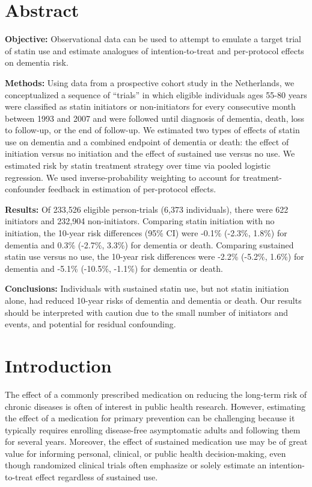 \documentclass[
]{book}
\begin{document}
\newpage
\normalsize

\hypertarget{abstract}{%
\section{Abstract}\label{abstract}}

\textbf{Objective:} Observational data can be used to attempt to emulate a target trial of statin use and estimate analogues of intention-to-treat and per-protocol effects on dementia risk.

\textbf{Methods:} Using data from a prospective cohort study in the Netherlands, we conceptualized a sequence of ``trials'' in which eligible individuals ages 55-80 years were classified as statin initiators or non-initiators for every consecutive month between 1993 and 2007 and were followed until diagnosis of dementia, death, loss to follow-up, or the end of follow-up. We estimated two types of effects of statin use on dementia and a combined endpoint of dementia or death: the effect of initiation versus no initiation and the effect of sustained use versus no use. We estimated risk by statin treatment strategy over time via pooled logistic regression. We used inverse-probability weighting to account for treatment-confounder feedback in estimation of per-protocol effects.

\textbf{Results:} Of 233,526 eligible person-trials (6,373 individuals), there were 622 initiators and 232,904 non-initiators. Comparing statin initiation with no initiation, the 10-year risk differences (95\% CI) were -0.1\% (-2.3\%, 1.8\%) for dementia and 0.3\% (-2.7\%, 3.3\%) for dementia or death. Comparing sustained statin use versus no use, the 10-year risk differences were -2.2\% (-5.2\%, 1.6\%) for dementia and -5.1\% (-10.5\%, -1.1\%) for dementia or death.

\textbf{Conclusions:} Individuals with sustained statin use, but not statin initiation alone, had reduced 10-year risks of dementia and dementia or death. Our results should be interpreted with caution due to the small number of initiators and events, and potential for residual confounding.

\newpage

\hypertarget{introduction}{%
\section{Introduction}\label{introduction}}

The effect of a commonly prescribed medication on reducing the long-term risk of chronic
diseases is often of interest in public health research. However, estimating the effect of a medication for primary prevention can be challenging because it typically requires enrolling disease-free asymptomatic adults and following them for several years. Moreover, the effect of sustained medication use may be of great value for informing personal, clinical, or public health decision-making, even though randomized clinical trials often emphasize or solely estimate an intention-to-treat effect regardless of sustained use\autocite{hernan_itt2012}.
\end{document}
